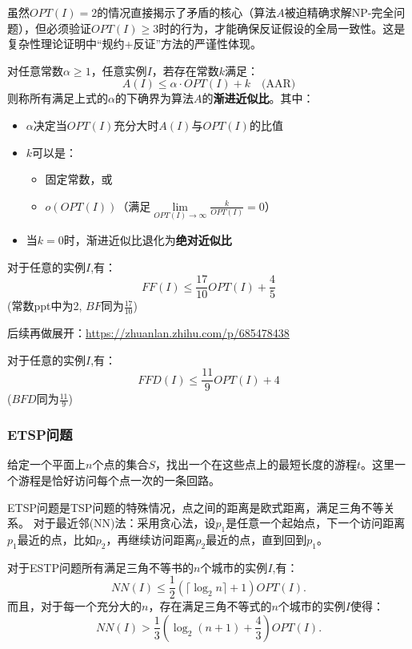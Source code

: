 \documentclass[./../main.tex]{subfiles} %
\begin{document}
虽然$OPT(I)=2$的情况直接揭示了矛盾的核心（算法$A$被迫精确求解NP-完全问题），但​必须验证$ OPT(I)\ge3$时的行为，才能确保反证假设的全局一致性。这是复杂性理论证明中“规约+反证”方法的严谨性体现。

\begin{definition}[渐进近似比]
对任意常数$\alpha \geq 1$，任意实例$I$，若存在常数$k$满足：
\begin{equation}\label{AAR}
A(I) \leq \alpha \cdot OPT(I) + k \quad \text{(AAR)}
\end{equation}
则称所有满足上式的$\alpha$的下确界为算法$A$的\textbf{渐进近似比}。其中：
\begin{itemize}
    \item $\alpha$决定当$OPT(I)$充分大时$A(I)$与$OPT(I)$的比值
    \item $k$可以是：
    \begin{itemize}
        \item 固定常数，或
        \item $o(OPT(I))$（满足$\lim\limits_{OPT(I) \to \infty} \frac{k}{OPT(I)} = 0$）
    \end{itemize}
    \item 当$k=0$时，渐进近似比退化为\textbf{绝对近似比}
\end{itemize}
\end{definition}

\begin{theorem}
    对于任意的实例$I$,有：
    $$
    FF(I)\le \frac{17}{10}OPT(I)+\frac{4}{5}
    $$
    (常数ppt中为2, $BF$同为$\frac{17}{10}$)
\end{theorem}

后续再做展开：\url{https://zhuanlan.zhihu.com/p/685478438}

\begin{theorem}
    对于任意的实例$I$,有：
    $$
    FFD(I)\le \frac{11}{9}OPT(I)+4
    $$
    ($BFD$同为$\frac{11}{9}$)
\end{theorem}

\subsubsection{ETSP问题}
给定一个平面上$n$个点的集合$S$，找出一个在这些点上的最短长度的游程$t$。这里一个游程是恰好访问每个点一次的一条回路。

ETSP问题是TSP问题的特殊情况，点之间的距离是欧式距离，满足三角不等关系。
对于最近邻(NN)法：采用贪心法，设$p_1$是任意一个起始点，下一个访问距离$p_1$最近的点，比如$p_2$，再继续访问距离$p_2$最近的点，直到回到$p_1$。
\begin{theorem}
    对于ESTP问题所有满足三角不等书的$n$个城市的实例$I$,有：
    $$
    NN(I)\le \frac{1}{2}(\lceil\log_2n\rceil+1)OPT(I).
    $$
    而且，对于每一个充分大的$n$，存在满足三角不等式的$n$个城市的实例$I$使得：
    $$
    NN(I)>\frac{1}{3}(\log_2(n+1)+\frac{4}{3})OPT(I).
    $$
\end{theorem}
\end{document}
